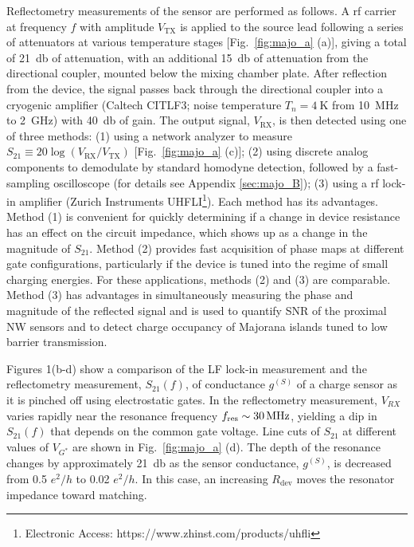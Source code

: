 Reflectometry measurements of the sensor are performed as follows. A rf carrier at frequency $f$ with amplitude $V_\textrm{TX}$ is applied to the source lead following a series of attenuators at various temperature stages [Fig.~\ref{fig:majo_a} (a)], giving a total of \SI{21}{\decibel} of attenuation, with an additional \SI{15}{\decibel} of attenuation from the directional coupler, mounted below the mixing chamber plate. After reflection from the device, the signal passes back through the directional coupler into a cryogenic amplifier (Caltech CITLF3; noise temperature $T_{n} =  \SI{4}{\kelvin}$ from \SI{10}{\mega\hertz} to \SI{2}{\giga\hertz}) with \SI{+40}{\decibel} of gain.  The output signal, $V_\textrm{RX}$, is then detected using one of three methods: (1) using a network analyzer to measure $S_{21}\equiv 20 \log (V_\textrm{RX}/V_\textrm{TX})$ [Fig.~\ref{fig:majo_a} (c)]; (2) using discrete analog components to demodulate by standard homodyne detection, followed by a fast-sampling oscilloscope (for details see Appendix \ref{sec:majo_B}); (3) using a rf lock-in amplifier (Zurich Instruments UHFLI\footnote{Electronic Access: https://www.zhinst.com/products/uhfli}). Each method has its advantages. Method (1) is convenient for quickly determining  if a change in device resistance has an effect on the circuit impedance, which shows up as a change in the magnitude of $S_{21}$. Method (2) provides fast acquisition of phase maps at different gate configurations, particularly if the device is tuned into the regime of small charging energies. For these applications, methods (2) and (3) are comparable. Method (3) has advantages in simultaneously measuring the phase and magnitude of the reflected signal and is used to quantify SNR of the proximal NW sensors and to detect charge occupancy of Majorana islands tuned to low barrier transmission.

Figures 1(b-d) show a comparison of the LF lock-in measurement and the reflectometry measurement, $S_{21}(f)$, of conductance $g^{(S)}$ of a charge sensor as it is pinched off using electrostatic gates.  In the reflectometry measurement, $V_{RX}$ varies rapidly near the resonance frequency $f_{\rm res} \sim \SI{30}{\mega\hertz}$, yielding a dip in $S_{21}(f)$ that depends on the common gate voltage.  Line cuts of $S_{21}$ at different values of $V_{G^{*}}$ are shown in Fig.~\ref{fig:majo_a} (d).
The depth of the resonance changes by approximately \SI{21}{\decibel} as the sensor conductance, $g^{(S)}$, is decreased from 0.5 $e^{2}/h$ to 0.02 $e^{2}/h$. In this case, an increasing $R_\textrm{dev}$ moves the resonator impedance toward matching.

